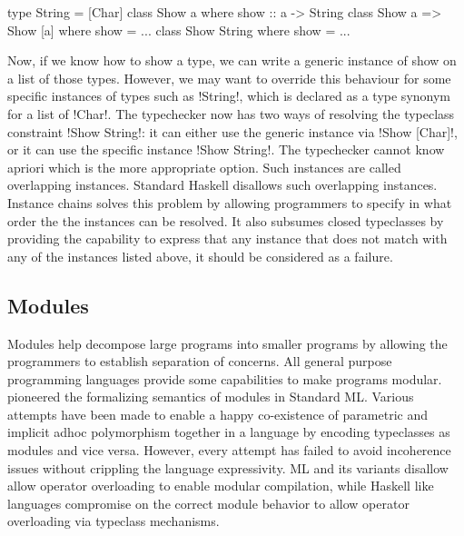 \documentclass[screen,nonacm]{acmart}
\begin{document}
\begin{CenteredBox}
\begin{code}
type String = [Char]
class Show a where show :: a -> String
class Show a => Show [a] where show = ...
class Show String where show = ...
\end{code}
\end{CenteredBox}
Now, if we know how to show a type, we can write a generic instance of show on a list of those types. However, we may want to override this behaviour for some specific instances of types such as !String!, which is declared as a type synonym for a list of !Char!. The typechecker now has two ways of resolving the typeclass constraint !Show String!: it can either use the generic instance via !Show [Char]!, or it can use the specific instance !Show String!. The typechecker cannot know apriori which is the more appropriate option. Such instances are called overlapping instances. Standard Haskell disallows such overlapping instances. Instance chains solves this problem by allowing programmers to specify in what order the the instances can be resolved. It also subsumes closed typeclasses by providing the capability to express that any instance that does not match with any of the instances listed above, it should be considered as a failure.

\subsection{Modules}\label{sec:rw-modules}
Modules help decompose large programs into smaller programs by allowing the programmers to establish separation of concerns. All general purpose programming languages provide some capabilities to make programs modular. \citet{macqueen_modules_1984} pioneered the formalizing semantics of modules in Standard ML.
Various attempts\cite{dreyer_modular_2007, wehr_ml_2008, white_modular_2014} have been made to enable a happy co-existence of parametric and implicit adhoc polymorphism together in a language by encoding typeclasses as modules and vice versa. However, every attempt has failed to avoid incoherence issues without crippling the language expressivity. ML and its variants\cite{milner_definition_1997,leroy_ocaml_2023} disallow allow operator overloading to enable modular compilation, while Haskell like languages compromise on the correct module behavior to allow operator overloading via typeclass mechanisms.
\end{document}
